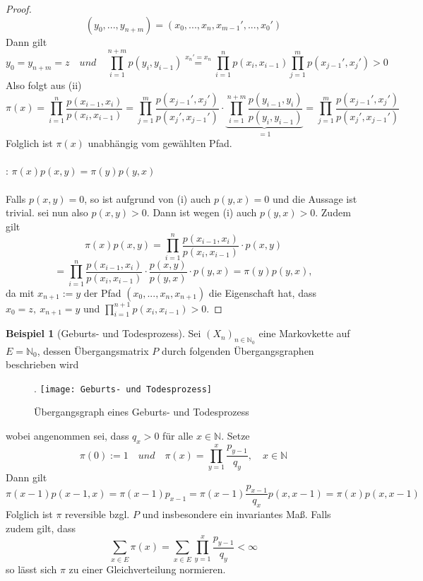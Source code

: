 \documentclass[a4paper,12pt]{scrartcl}
\theoremstyle{definition}
\newtheorem{bsp}{Beispiel}[section]
\begin{document}
\begin{proof}
\begin{equation*}
(y_{0},...,y_{n+m}) = (x_{0},...,x_{n},x_{m-1}',...,x_{0}')
\end{equation*}
Dann gilt
\begin{equation*}
y_{0} = y_{n+m} = z \quad und \quad \prod_{i=1}^{n+m} p(y_{i},y_{i-1}) \stackrel{x_{n}'=x_{n}}{=} \prod_{i=1}^{n} p(x_{i},x_{i-1})  \prod_{j=1}^{m} p(x_{j-1}',x_{j}')>0
\end{equation*}
Also folgt aus (ii)
\begin{equation*}
\pi(x) = \prod_{i=1}^{n} \dfrac{p(x_{i-1},x_{i})}{p(x_{i},x_{i-1})} = \prod_{j=1}^{m} \dfrac{p(x_{j-1}',x_{j}')}{p(x_{j}',x_{j-1}')} \cdot \underbrace{\prod_{i=1}^{n+m} \dfrac{p(y_{i-1},y_{i})}{p(y_{i},y_{i-1})}} _{=1} = \prod_{j=1}^{m} \dfrac{p(x_{j-1}',x_{j}')}{p(x_{j}',x_{j-1}')}
\end{equation*}
Folglich ist $\pi(x)$ unabhängig vom gewählten Pfad.
\\
\\
: $\pi(x)p(x,y) = \pi(y) p(y,x)$
\\
\\
Falls $p(x,y)=0$, so ist aufgrund von (i) auch $p(y,x)=0$ und die Aussage ist trivial. sei nun also $p(x,y)>0$. Dann ist wegen (i) auch $p(y,x)>0$. Zudem gilt
\begin{equation*}
\pi(x)p(x,y) = \prod_{i=1}^{n} \dfrac{p(x_{i-1},x_{i})}{p(x_{i},x_{i-1})}  \cdot p(x,y)
\end{equation*}
\begin{equation*}
= \prod_{i=1}^{n} \dfrac{p(x_{i-1},x_{i})}{p(x_{i},x_{i-1})}  \cdot \dfrac{p(x,y)}{p(y,x)} \cdot p(y,x) = \pi(y)p(y,x),
\end{equation*}
da mit $x_{n+1}:= y$ der Pfad $(x_{0},...,x_{n},x_{n+1})$ die Eigenschaft hat, dass $x_{0} = z, \: x_{n+1} = y$ und $\prod_{i=1}^{n+1} p(x_{i},x_{i-1})>0$.
\end{proof}
\begin{bsp}[Geburts- und Todesprozess]
Sei $(X_{n})_{n \in \mathbb{N}_{0}}$ eine Markovkette auf $E = \mathbb{N}_{0}$, dessen Übergangsmatrix $P$ durch folgenden Übergangsgraphen beschrieben wird
\begin{figure}[H].
\centering
\texttt{[image: Geburts- und Todesprozess]}
\caption{Übergangsgraph eines Geburts- und Todesprozess}
\end{figure}
\noindent
wobei angenommen sei, dass $q_{x} > 0$ für alle $x \in \mathbb{N}$. Setze
\begin{equation*}
\pi(0) := 1 \quad und \quad \pi(x) = \prod_{y=1}^{x} \dfrac{p_{y-1}}{q_{y}}, \quad x \in \mathbb{N}
\end{equation*} 
Dann gilt
\begin{equation*}
\pi(x-1)p(x-1,x) = \pi(x-1)p_{x-1} = \pi(x-1) \dfrac{p_{x-1}}{q_{x}}p(x,x-1) = \pi(x)p(x,x-1)
\end{equation*}
Folglich ist $\pi$ reversible bzgl. $P$ und insbesondere ein invariantes Maß. Falls zudem gilt, dass
\begin{equation*}
\sum_{x \in E} \pi(x) = \sum_{x \in E} \prod_{y=1}^{x} \dfrac{p_{y-1}}{q_{y}} < \infty
\end{equation*}
so lässt sich $\pi$ zu einer Gleichverteilung normieren.
\end{bsp}
\end{document}
